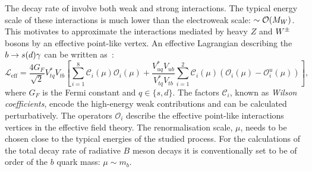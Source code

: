 The decay rate of \BtoXsdgamma involve both weak and strong interactions.
The typical energy scale of these interactions is much lower than the electroweak scale: $\sim{\ensuremath{\cal O}}(M_W)$.
This motivates to approximate the interactions mediated by heavy $Z$ and $W^\pm$ bosons by an effective point-like vertex.
An effective Lagrangian describing the $b\rightarrow s(d)\gamma$ can be written as~\cite{Kaminski:2012eb,Misiak:2015xwa}:
\begin{equation}\label{eq:effective_lagrangian}
    \mathcal{L}_{\mathrm{eff}} = \frac{4G_F}{\sqrt{2}}V_{tq}^*V_{tb}\left[\sum^{8}_{i=1}\mathcal{C}_i(\mu)\mathcal{O}_i(\mu)
                                                + \frac{V^*_{uq}V_{ub}}{V^*_{tq}V_{tb}}\sum^{2}_{i=1}\mathcal{C}_i(\mu)(\mathcal{O}_i(\mu)-\mathcal{O}_i^u(\mu))\right],
\end{equation}
where $G_F$ is the Fermi constant and $q\in\{s,d\}$.
The factors $\mathcal{C}_i$, known as \textit{Wilson coefficients}, encode the high-energy weak contributions and can be calculated perturbatively.
The operators $\mathcal{O}_i$ describe the effective point-like interactions vertices in the effective field theory.
The renormalisation scale, $\mu$, needs to be chosen close to the typical energies of the studied process.
For the calculations of the total decay rate of radiative $B$ meson decays it is conventionally set to be of order of the $b$ quark mass: $\mu\sim m_b$.


